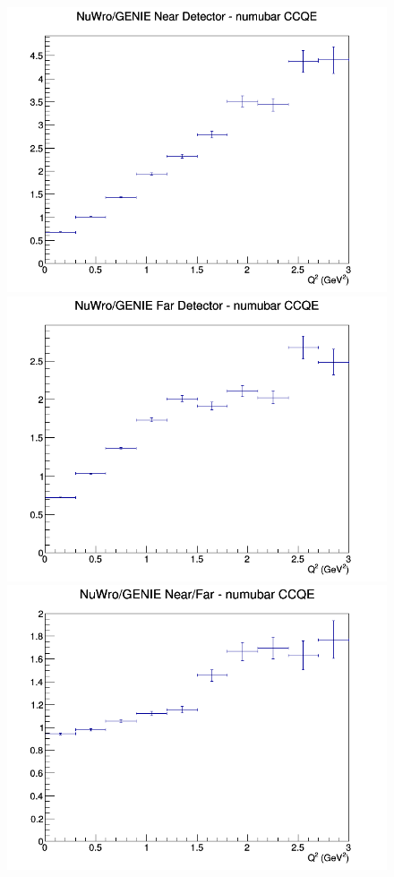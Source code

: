 \documentclass[12pt]{article}
\begin{document}
\begin{figure}[h]
\endminipage
\newline
{}
\includegraphics[width=\linewidth]{Q2/nominal/ratios/CCQE_NuWro_GENIE_numubar_near_Q2.png}
\endminipage
{}
\includegraphics[width=\linewidth]{Q2/nominal/ratios/CCQE_NuWro_GENIE_numubar_far_Q2.png}
\endminipage
{}
\includegraphics[width=\linewidth]{Q2/nominal/ratios/CCQE_NuWro_GENIE_numubar_NF_Q2.png}

\end{figure}
\end{document}
